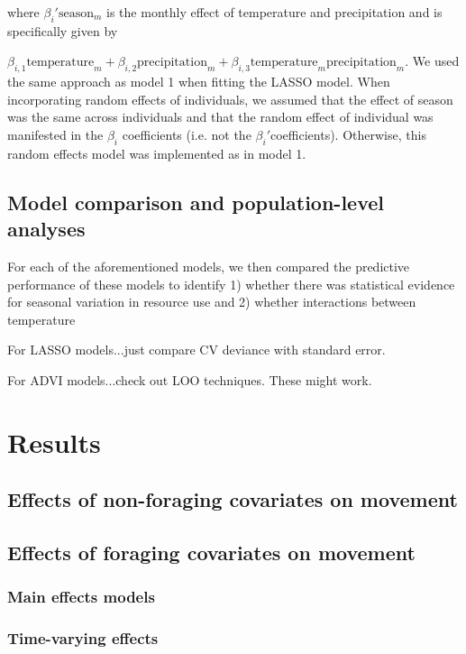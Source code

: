 \documentclass[a4paper]{article}
\begin{document}
where $\beta_i' \text{season}_m$ is the monthly effect of temperature and precipitation and is specifically given by {$\beta_{i, 1}\text{temperature}_m + \beta_{i, 2} \text{precipitation}_m + \beta_{i, 3} \text{temperature}_m \text{precipitation}_m$.  We used the same approach as model 1 when fitting the LASSO model. When incorporating random effects of individuals, we assumed that the effect of season was the same across individuals and that the random effect of individual was manifested in the $\beta_i$ coefficients (i.e. not the $\beta_i'$coefficients).  Otherwise, this random effects model was implemented as in model 1. 

\subsection*{Model comparison and population-level analyses}

For each of the aforementioned models, we then compared the predictive performance of these models to identify 1) whether there was statistical evidence for seasonal variation in resource use and 2) whether interactions between temperature 

For LASSO models...just compare CV deviance with standard error.

For ADVI models...check out LOO techniques.  These might work. 

\section*{Results}

\subsection*{Effects of non-foraging covariates on movement}

\subsection*{Effects of foraging covariates on movement}

\subsubsection*{Main effects models}

\subsubsection*{Time-varying effects}

}
\end{document}
